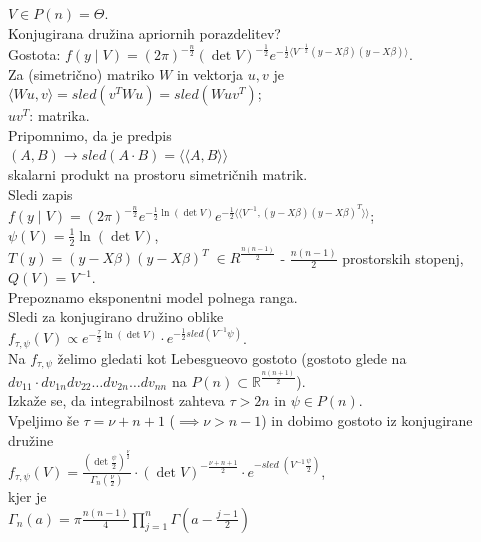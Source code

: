 \documentclass[a4paper, 12pt]{book}
\theoremstyle{definition}
\theoremstyle{remark}
\newcommand{\R}{\mathbb{R}}
\begin{document}
$V \in P(n) = \Theta$. \\
Konjugirana družina apriornih porazdelitev? \\
Gostota: $f(y \mid V) = (2 \pi)^{-\frac{n}{2}} (\det V)^{-\frac{1}{2}}
e^{-\frac{1}{2} \langle V^{-\frac{1}{2}} (y - X \beta) (y - X \beta) \rangle}$. \\
Za (simetrično) matriko $W$ in vektorja $u, v$ je \\
$\langle W u, v \rangle = sled(v^T W u) = sled(W u v^T)$; \\
$u v^T$: matrika. \\
Pripomnimo, da je predpis \\
$(A, B) \to sled(A \cdot B) = \langle \langle A, B \rangle \rangle$ \\
skalarni produkt na prostoru simetričnih matrik. \\
Sledi zapis \\
$f(y \mid V) = (2 \pi)^{-\frac{n}{2}} e^{-\frac{1}{2} \ln (\det V)}
e^{-\frac{1}{2} \langle \langle V^{-1}, (y - X \beta) (y - X \beta)^T \rangle \rangle}$; \\
$\psi(V) = \frac{1}{2} \ln (\det V)$, \\
$T(y) = (y - X \beta) (y - X \beta)^T \; \in R^{\frac{n(n-1)}{2}}$ - $\frac{n(n-1)}{2}$ prostorskih stopenj, \\
$Q(V) = V^{-1}$. \\
Prepoznamo eksponentni model polnega ranga. \\
Sledi  za konjugirano družino oblike \\
$f_{\tau, \psi}(V) \propto e^{-\frac{\tau}{2} \ln (\det V)} \cdot
e^{-\frac{1}{2} sled(V^{-1} \psi)}$. \\
Na $f_{\tau, \psi}$ želimo gledati kot Lebesgueovo gostoto (gostoto glede na \\
$dv_{11} \cdot dv_{1n} dv_{22} \dots dv_{2n} \dots dv_{nn}$ na $P(n) \subset \R^{\frac{n(n+1)}{2}}$). \\
Izkaže se, da integrabilnost zahteva $\tau > 2n$ in $\psi \in P(n)$. \\
Vpeljimo še $\tau = \nu + n + 1$ ($\implies \nu > n-1$) in dobimo gostoto iz konjugirane družine \\
$f_{\tau, \psi}(V) = \frac{(\det \frac{\psi}{2})^{\frac{\nu}{2}}}{\Gamma_n\left(\frac{\nu}{2}\right)}
\cdot (\det V)^{-\frac{\nu + n + 1}{2}} \cdot e^{-sled \; \left(V^{-1} \frac{\psi}{2}\right)}$, \\
kjer je \\
$\Gamma_n(a) = \pi \frac{n(n-1)}{4} \prod_{j=1}^{n} \Gamma\left(a - \frac{j-1}{2}\right)$
\end{document}
